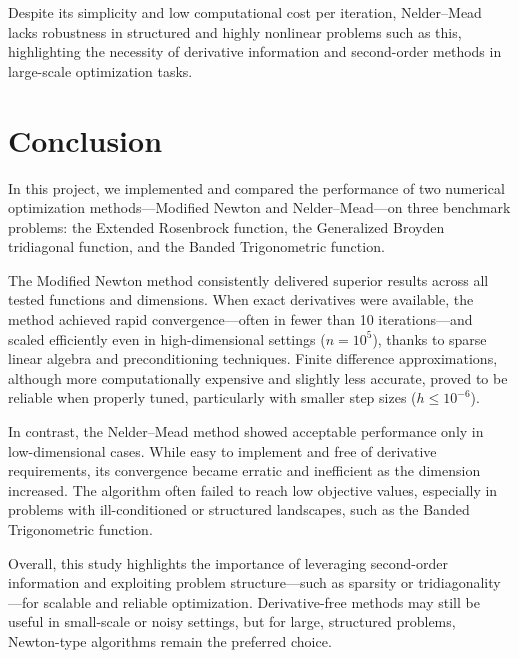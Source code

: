 \documentclass[a4paper,12pt]{article}
\begin{document}
	Despite its simplicity and low computational cost per iteration, Nelder–Mead lacks robustness in structured and highly nonlinear problems such as this, highlighting the necessity of derivative information and second-order methods in large-scale optimization tasks.
	
	
	\section{Conclusion}
	
	In this project, we implemented and compared the performance of two numerical optimization methods—Modified Newton and Nelder–Mead—on three benchmark problems: the Extended Rosenbrock function, the Generalized Broyden tridiagonal function, and the Banded Trigonometric function.
	
	The Modified Newton method consistently delivered superior results across all tested functions and dimensions. When exact derivatives were available, the method achieved rapid convergence—often in fewer than 10 iterations—and scaled efficiently even in high-dimensional settings ($n = 10^5$), thanks to sparse linear algebra and preconditioning techniques. Finite difference approximations, although more computationally expensive and slightly less accurate, proved to be reliable when properly tuned, particularly with smaller step sizes ($h \leq 10^{-6}$).
	
	In contrast, the Nelder–Mead method showed acceptable performance only in low-dimensional cases. While easy to implement and free of derivative requirements, its convergence became erratic and inefficient as the dimension increased. The algorithm often failed to reach low objective values, especially in problems with ill-conditioned or structured landscapes, such as the Banded Trigonometric function.
	
	Overall, this study highlights the importance of leveraging second-order information and exploiting problem structure—such as sparsity or tridiagonality—for scalable and reliable optimization. Derivative-free methods may still be useful in small-scale or noisy settings, but for large, structured problems, Newton-type algorithms remain the preferred choice.
	
	
	
\end{document}
